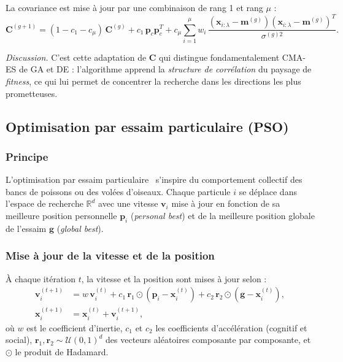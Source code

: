 La covariance est mise à jour par une combinaison de rang 1 et rang $\mu$ :
\begin{equation}
\label{eq:C-update}
  \mathbf{C}^{(g+1)} = (1 - c_1 - c_\mu)\,\mathbf{C}^{(g)}
    + c_1\,\mathbf{p}_c \mathbf{p}_c^T
    + c_\mu \sum_{i=1}^{\mu} w_i \,
      \frac{(\mathbf{x}_{i:\lambda} - \mathbf{m}^{(g)})
            (\mathbf{x}_{i:\lambda} - \mathbf{m}^{(g)})^T}
           {\sigma^{(g)2}}.
\end{equation}

\emph{Discussion.}  C'est cette adaptation de $\mathbf{C}$ qui distingue
fondamentalement CMA-ES de GA et DE : l'algorithme apprend la \emph{structure de corrélation} du paysage de \textit{fitness}, ce qui lui permet de concentrer la
    recherche dans les directions les plus prometteuses.

\subsection{Optimisation par essaim particulaire (PSO)}
\label{sec:pso}

\subsubsection{Principe}
L'optimisation par essaim particulaire~\cite{kennedy1995} s'inspire du
comportement collectif des bancs de poissons ou des volées d'oiseaux.  Chaque
particule $i$ se déplace dans l'espace de recherche $\mathbb{R}^d$ avec une
vitesse $\mathbf{v}_i$ mise à jour en fonction de sa meilleure position
personnelle $\mathbf{p}_i$ (\textit{personal best}) et de la meilleure position
globale de l'essaim $\mathbf{g}$ (\textit{global best}).

\subsubsection{Mise à jour de la vitesse et de la position}
À chaque itération $t$, la vitesse et la position sont mises à jour selon :
\begin{align}
\label{eq:pso-velocity}
    \mathbf{v}_i^{(t+1)} &= w \, \mathbf{v}_i^{(t)}
      + c_1 \, \mathbf{r}_1 \odot (\mathbf{p}_i - \mathbf{x}_i^{(t)})
      + c_2 \, \mathbf{r}_2 \odot (\mathbf{g} - \mathbf{x}_i^{(t)}), \\
\label{eq:pso-position}
    \mathbf{x}_i^{(t+1)} &= \mathbf{x}_i^{(t)} + \mathbf{v}_i^{(t+1)},
\end{align}
où $w$ est le coefficient d'inertie, $c_1$ et $c_2$ les coefficients
d'accélération (cognitif et social), $\mathbf{r}_1, \mathbf{r}_2 \sim
\mathcal{U}(0,1)^d$ des vecteurs aléatoires composante par composante, et
$\odot$ le produit de Hadamard.

